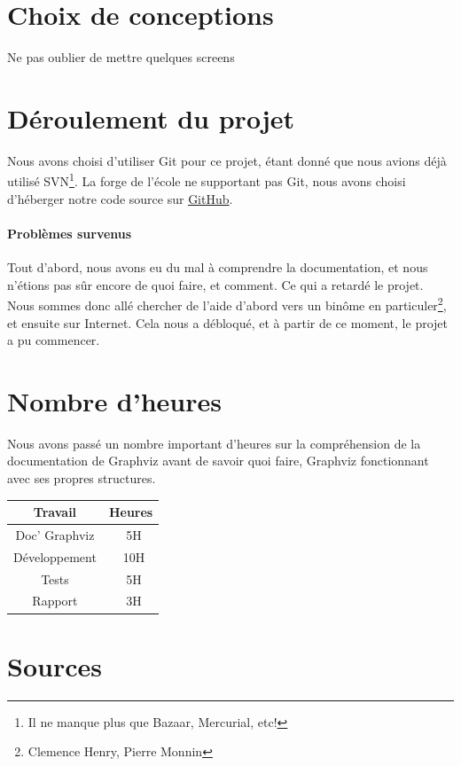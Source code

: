 \documentclass[12pt,a4paper]{report}
\begin{document}
\section{Choix de conceptions}
Ne pas oublier de mettre quelques screens

\section{D\'{e}roulement du projet}
Nous avons choisi d'utiliser Git pour ce projet, \'{e}tant donn\'{e} que nous avions d\'{e}j\`{a} utilis\'{e} SVN\footnote{Il ne manque plus que Bazaar, Mercurial, etc!}. La forge de l'\'{e}cole ne supportant pas Git, nous avons choisi d'h\'{e}berger notre code source sur \href{https://github.com/Videl/Graph-Visualization-Manager}{GitHub}.
\paragraph{Problèmes survenus}
Tout d'abord, nous avons eu du mal \`{a} comprendre la documentation, et nous n'\'{e}tions pas s\^ur encore de quoi faire, et comment. Ce qui a retard\'{e} le projet. Nous sommes donc all\'{e} chercher de l'aide d'abord vers un binôme en particuler\footnote{Clemence Henry, Pierre Monnin}, et ensuite sur Internet. Cela nous a d\'{e}bloqu\'{e}, et \`{a} partir de ce moment, le projet a pu commencer.

\section{Nombre d'heures}
Nous avons pass\'{e} un nombre important d'heures sur la compr\'{e}hension de la documentation de Graphviz avant de savoir quoi faire, Graphviz fonctionnant avec ses propres structures.

\begin{tabular}{|c|c|}
  \hline
  Travail & Heures \\
  \hline
  Doc' Graphviz & ~5H \\
  \hline
  D\'{e}veloppement	&	~10H \\
  \hline
  Tests	&	~5H \\ 
  \hline
  Rapport	&	~3H \\
  \hline
\end{tabular}

\section{Sources}
\end{document}
